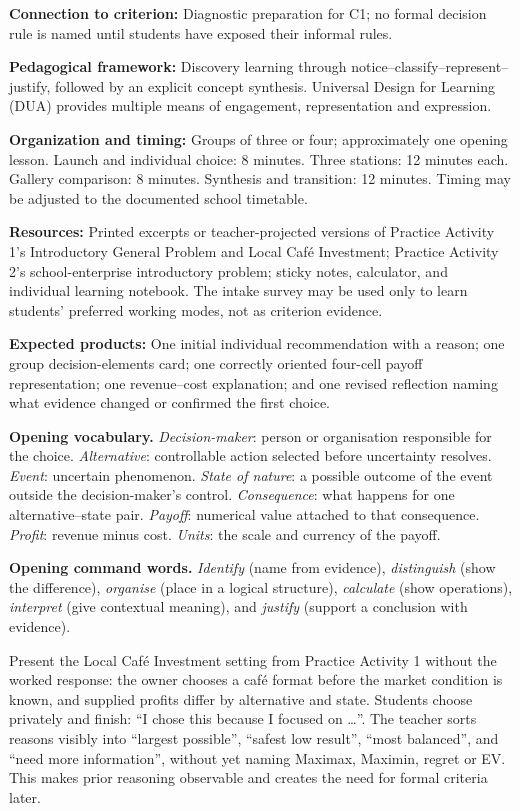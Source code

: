 \documentclass[10pt,letterpaper]{article}
\newcommand{\labelled}[2]{\textbf{#1:} #2\par}
\newcommand{\plansection}[1]{\Needspace{8\baselineskip}\par\vspace{8pt}{\large\bfseries #1\par}\vspace{3pt}}
\newcommand{\partheading}[1]{\Needspace{7\baselineskip}\par\vspace{4pt}{\bfseries #1\par}}
\begin{document}
\plansection{4. Pre-lesson and Context: Discovering How We Decide}

\labelled{Connection to criterion}{Diagnostic preparation for C1; no formal
decision rule is named until students have exposed their informal rules.}
\labelled{Pedagogical framework}{Discovery learning through notice--classify--represent--justify, followed by an explicit concept synthesis. Universal Design for Learning (DUA) provides multiple means of engagement, representation and expression.}
\labelled{Organization and timing}{Groups of three or four; approximately one opening lesson. Launch and individual choice: 8 minutes. Three stations: 12 minutes each. Gallery comparison: 8 minutes. Synthesis and transition: 12 minutes. Timing may be adjusted to the documented school timetable.}
\labelled{Resources}{Printed excerpts or teacher-projected versions of Practice Activity 1's Introductory General Problem and Local Caf\'e Investment; Practice Activity 2's school-enterprise introductory problem; sticky notes, calculator, and individual learning notebook. The intake survey may be used only to learn students' preferred working modes, not as criterion evidence.}
\labelled{Expected products}{One initial individual recommendation with a reason; one group decision-elements card; one correctly oriented four-cell payoff representation; one revenue--cost explanation; and one revised reflection naming what evidence changed or confirmed the first choice.}

\textbf{Opening vocabulary.} \emph{Decision-maker}: person or organisation
responsible for the choice. \emph{Alternative}: controllable action selected
before uncertainty resolves. \emph{Event}: uncertain phenomenon. \emph{State
of nature}: a possible outcome of the event outside the decision-maker's
control. \emph{Consequence}: what happens for one alternative--state pair.
\emph{Payoff}: numerical value attached to that consequence. \emph{Profit}:
revenue minus cost. \emph{Units}: the scale and currency of the payoff.

\textbf{Opening command words.} \emph{Identify} (name from evidence),
\emph{distinguish} (show the difference), \emph{organise} (place in a logical
structure), \emph{calculate} (show operations), \emph{interpret} (give
contextual meaning), and \emph{justify} (support a conclusion with evidence).

\partheading{Launch---an unrevealed decision rule}
Present the Local Caf\'e Investment setting from Practice Activity 1 without
the worked response: the owner chooses a caf\'e format before the market
condition is known, and supplied profits differ by alternative and state.
Students choose privately and finish: ``I chose this because I focused on
\ldots''. The teacher sorts reasons visibly into ``largest possible'', ``safest
low result'', ``most balanced'', and ``need more information'', without yet
naming Maximax, Maximin, regret or EV. This makes prior reasoning observable
and creates the need for formal criteria later.
\end{document}
